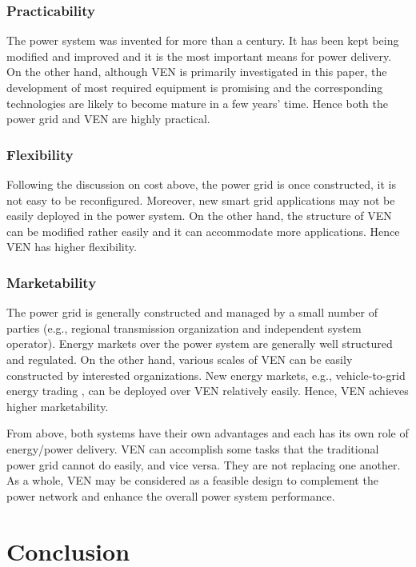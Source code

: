 \documentclass[journal]{IEEEtran}
\begin{document}
\subsubsection{Practicability}
The power system was invented for more than a century. It has been kept being modified and improved and it is the most important means for power delivery. On the other hand, although VEN is primarily investigated in this paper, the development of most required equipment is promising and the corresponding technologies are likely to become mature in a few years’ time. Hence both the power grid and VEN are highly practical.
\subsubsection{Flexibility}
Following the discussion on cost above, the power grid is once constructed, it is not easy to be reconfigured. Moreover, new smart grid applications may not be easily deployed in the power system. On the other hand, the structure of VEN can be modified rather easily and it can accommodate more applications. Hence VEN has higher flexibility.
\subsubsection{Marketability}
The power grid is generally constructed and managed by a small number of parties (e.g., regional transmission organization and independent system operator).  Energy markets over the power system are generally well structured and regulated. On the other hand, various scales of VEN can be easily constructed by interested organizations. New energy markets, e.g., vehicle-to-grid energy trading \cite{V2GMarket,EVprofit}, can be deployed over VEN relatively easily. Hence, VEN achieves higher marketability.


From above, both systems have their own advantages and each has its own role of energy/power delivery. VEN can accomplish some tasks that the traditional power grid cannot do easily, and vice versa. They are not replacing one another. As a whole, VEN may be considered as a feasible design to complement the power network and enhance the overall power system performance.



\section{Conclusion} \label{sec:conclusion}
\end{document}
